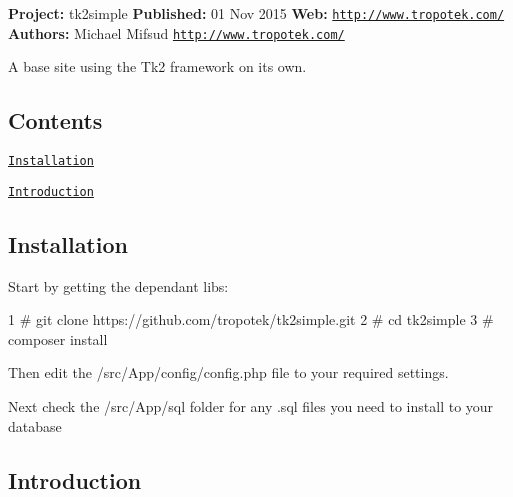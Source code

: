 {\bfseries Project\+:} tk2simple {\bfseries Published\+:} 01 Nov 2015 {\bfseries Web\+:} \href{http://www.tropotek.com/}{\tt http\+://www.\+tropotek.\+com/} {\bfseries Authors\+:} Michael Mifsud \href{http://www.tropotek.com/}{\tt http\+://www.\+tropotek.\+com/}

A base site using the Tk2 framework on its own.

\subsection*{Contents}


\begin{DoxyItemize}
\item \href{#installation}{\tt Installation}
\item \href{#introduction}{\tt Introduction}
\end{DoxyItemize}

\subsection*{Installation}

Start by getting the dependant libs\+:


\begin{DoxyCode}
1 # git clone https://github.com/tropotek/tk2simple.git
2 # cd tk2simple
3 # composer install
\end{DoxyCode}


Then edit the /src/\+App/config/config.php file to your required settings.

Next check the /src/\+App/sql folder for any .sql files you need to install to your database

\subsection*{Introduction}